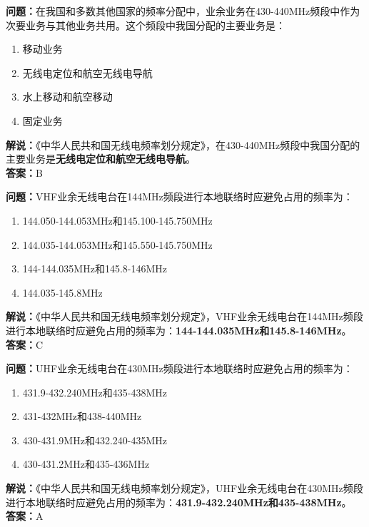 \documentclass{ctexbook}
\begin{document}
\bigskip


\noindent\textbf{问题：}在我国和多数其他国家的频率分配中，业余业务在430-440MHz频段中作为次要业务与其他业务共用。这个频段中我国分配的主要业务是：
\begin{enumerate}[label=\Alph*), leftmargin=3em]
	\item 移动业务
	\item 无线电定位和航空无线电导航
	\item 水上移动和航空移动
	\item 固定业务
\end{enumerate}
\noindent\textbf{解说：}《中华人民共和国无线电频率划分规定》，在430-440MHz频段中我国分配的主要业务是\textbf{无线电定位和航空无线电导航}。\\\noindent\textbf{答案：}B



\bigskip


\noindent\textbf{问题：}VHF业余无线电台在144MHz频段进行本地联络时应避免占用的频率为：
\begin{enumerate}[label=\Alph*), leftmargin=3em]
	\item 144.050-144.053MHz和145.100-145.750MHz
	\item 144.035-144.053MHz和145.550-145.750MHz
	\item 144-144.035MHz和145.8-146MHz
	\item 144.035-145.8MHz
\end{enumerate}
\noindent\textbf{解说：}《中华人民共和国无线电频率划分规定》，VHF业余无线电台在144MHz频段进行本地联络时应避免占用的频率为：\textbf{144-144.035MHz和145.8-146MHz}。\\\noindent\textbf{答案：}C



\bigskip


\noindent\textbf{问题：}UHF业余无线电台在430MHz频段进行本地联络时应避免占用的频率为：
\begin{enumerate}[label=\Alph*), leftmargin=3em]
	\item 431.9-432.240MHz和435-438MHz
	\item 431-432MHz和438-440MHz
	\item 430-431.9MHz和432.240-435MHz
	\item 430-431.2MHz和435-436MHz
\end{enumerate}
\noindent\textbf{解说：}《中华人民共和国无线电频率划分规定》，UHF业余无线电台在430MHz频段进行本地联络时应避免占用的频率为：\textbf{431.9-432.240MHz和435-438MHz}。\\\noindent\textbf{答案：}A
\end{document}
